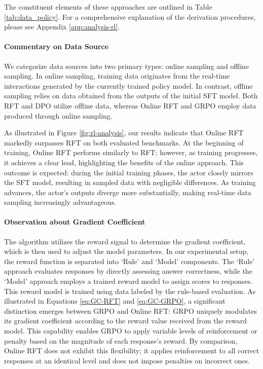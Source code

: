 \begin{itemize}[topsep=0pt]
The constituent elements of these approaches are outlined in Table \ref{tab:data_policy}. For a comprehensive explanation of the derivation procedures, please see Appendix \ref{app:analysis-rl}.

\paragraph{Commentary on Data Source} We categorize data sources into two primary types: online sampling and offline sampling. In online sampling, training data originates from the real-time interactions generated by the currently trained policy model. In contrast, offline sampling relies on data obtained from the outputs of the initial SFT model. Both RFT and DPO utilize offline data, whereas Online RFT and GRPO employ data produced through online sampling.

As illustrated in Figure \ref{fig:rl-analysis}, our results indicate that Online RFT markedly surpasses RFT on both evaluated benchmarks. At the beginning of training, Online RFT performs similarly to RFT; however, as training progresses, it achieves a clear lead, highlighting the benefits of the online approach. This outcome is expected: during the initial training phases, the actor closely mirrors the SFT model, resulting in sampled data with negligible differences. As training advances, the actor’s outputs diverge more substantially, making real-time data sampling increasingly advantageous.

\paragraph{Observation about Gradient Coefficient} The algorithm utilizes the reward signal to determine the gradient coefficient, which is then used to adjust the model parameters. In our experimental setup, the reward function is separated into `Rule' and `Model' components. The `Rule' approach evaluates responses by directly assessing answer correctness, while the `Model' approach employs a trained reward model to assign scores to responses. This reward model is trained using data labeled by the rule-based evaluation. As illustrated in Equations \ref{eq:GC-RFT} and \ref{eq:GC-GRPO}, a significant distinction emerges between GRPO and Online RFT: GRPO uniquely modulates its gradient coefficient according to the reward value received from the reward model. This capability enables GRPO to apply variable levels of reinforcement or penalty based on the magnitude of each response’s reward. By comparison, Online RFT does not exhibit this flexibility; it applies reinforcement to all correct responses at an identical level and does not impose penalties on incorrect ones.


\end{itemize}
